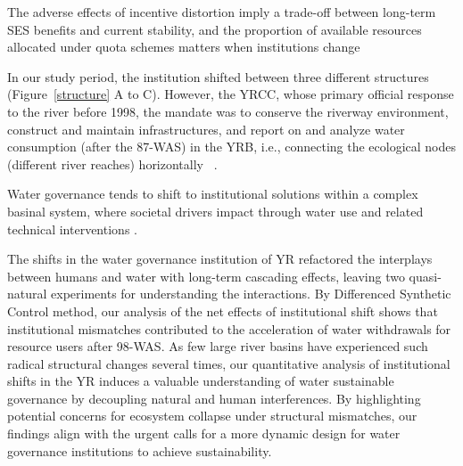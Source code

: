 The adverse effects of incentive distortion imply a trade-off between long-term SES benefits and current stability, and the proportion of available resources allocated under quota schemes matters when institutions change \cite{lade2013}


In our study period, the institution shifted between three different structures (Figure~\ref{structure} A to C).
However, the YRCC, whose primary official response to the river before 1998, the mandate was to conserve the riverway environment, construct and maintain infrastructures, and report on and analyze water consumption (after the 87-WAS) in the YRB, i.e., connecting the ecological nodes (different river reaches) horizontally ~\cite{wang2019a}.


Water governance tends to shift to institutional solutions within a complex basinal system, where societal drivers impact through water use and related technical interventions \cite{fischer2020}.

The shifts in the water governance institution of YR refactored the interplays between humans and water with long-term cascading effects, leaving two quasi-natural experiments for understanding the interactions.
By Differenced Synthetic Control method, our analysis of the net effects of institutional shift shows that institutional mismatches contributed to the acceleration of water withdrawals for resource users after 98-WAS.
As few large river basins have experienced such radical structural changes several times, our quantitative analysis of institutional shifts in the YR induces a valuable understanding of water sustainable governance by decoupling natural and human interferences.
By highlighting potential concerns for ecosystem collapse under structural mismatches, our findings align with the urgent calls for a more dynamic design for water governance institutions to achieve sustainability.


